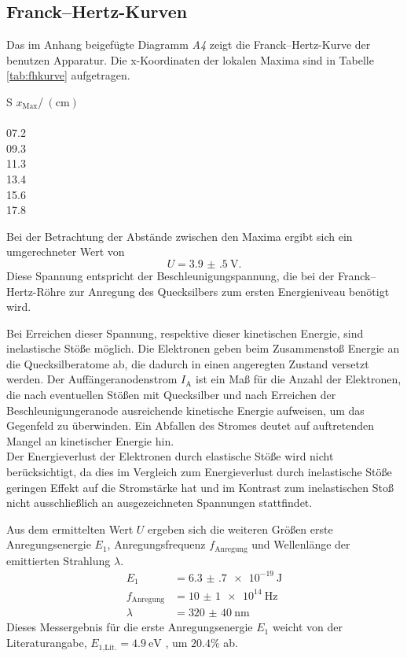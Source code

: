 \subsection{Franck--Hertz-Kurven} %
\label{sec:fhk}
Das im Anhang beigefügte Diagramm \emph{A4} zeigt die Franck--Hertz-Kurve der benutzen Apparatur.
Die x-Koordinaten der lokalen Maxima sind in Tabelle \ref{tab:fhkurve} aufgetragen.
\begin{table}
	\centering
		\begin{tabular}{S}
		\toprule
		{$x_\text{Max}$/$\:(\si{\centi\meter})$}\\
		\\
			07.2\\
			09.3\\
			11.3\\
			13.4\\
			15.6\\
			17.8
		\end{tabular}
	\caption{x-Koordinaten der Maxima der Franck--Hertz-Kurve, ausgelesen aus Appendix \emph{A4}.}
	\label{tab:fhkurve}
\end{table}
Bei der Betrachtung der Abstände zwischen den Maxima ergibt sich ein umgerechneter Wert von
\begin{equation}
	U=\SI{3.9(5)}{\volt}.
\end{equation}
Diese Spannung entspricht der Beschleunigungspannung, die bei der Franck--Hertz-Röhre zur Anregung des Quecksilbers zum ersten Energieniveau benötigt wird.

Bei Erreichen dieser Spannung, respektive dieser kinetischen Energie, sind inelastische Stöße möglich. Die Elektronen geben beim Zusammenstoß Energie an die Quecksilberatome ab, die dadurch in einen angeregten Zustand versetzt werden.
Der Auffängeranodenstrom $I_\mathup{A}$ ist ein Maß für die Anzahl der Elektronen, die nach eventuellen Stößen mit Quecksilber und nach Erreichen der Beschleunigungeranode ausreichende kinetische Energie aufweisen, um das Gegenfeld zu überwinden.
Ein Abfallen des Stromes deutet auf auftretenden Mangel an kinetischer Energie hin.\\
Der Energieverlust der Elektronen durch elastische Stöße wird nicht berücksichtigt, da dies im Vergleich zum Energieverlust durch inelastische Stöße geringen Effekt auf die Stromstärke hat und im Kontrast zum inelastischen Stoß nicht ausschließlich an ausgezeichneten Spannungen stattfindet.

Aus dem ermittelten Wert $U$ ergeben sich die weiteren Größen erste Anregungsenergie $E_1$, Anregungsfrequenz $f_\text{Anregung}$ und Wellenlänge der emittierten Strahlung $\lambda$.
\begin{align}	
	E_1		&=\SI{6.3(7)e-19}{\joule}\\
	f_\text{Anregung}	&=\SI{10(1)e+14}{\hertz}\\
	\lambda				&=\SI{320(40)}{\nano\meter}
\end{align}
Dieses Messergebnis für die erste Anregungsenergie $E_1$ weicht von der Literaturangabe, $E_{1\text{,Lit.}}=\SI{4.9}{\electronvolt}$ \cite{IonEx}, um $20.4\%$ ab.

